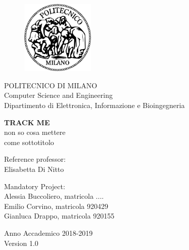 \thispagestyle{empty}

\vspace*{-2.5cm} 
\bfseries{
    \begin{center}
    
    \begin{figure}[htbp]
        \begin{center}
          \includegraphics[width=3.5cm]{./pictures/logopm}
        \end{center}
      \end{figure}
    
      \large
      POLITECNICO DI MILANO\\
      \normalsize
      Computer Science and Engineering \\
      Dipartimento di Elettronica, Informazione e Bioingegneria\\
      
      \vspace*{3.3cm} \LARGE
    
      \textbf{TRACK ME}\\
      
      \vspace*{.75truecm} \large
      non so cosa mettere \\
      come sottotitolo
    \end{center}

    \vspace*{2.0cm} \large
    \begin{flushleft}
    
      Reference professor: \\
      Elisabetta Di Nitto
    
    \end{flushleft}
    
    \vspace*{1.0cm}
    \begin{flushright}
    
    Mandatory Project:\\
    Alessia Buccoliero, matricola ....\\
    Emilio Corvino, matricola 920429\\
    Gianluca Drappo, matricola 920155
    
    \end{flushright}
    
    \vspace*{0.5cm}
    \begin{center}
    
      Anno Accademico 2018-2019 \\
      
      \vspace*{1.0cm}
      Version 1.0
    \end{center} \clearpage
}